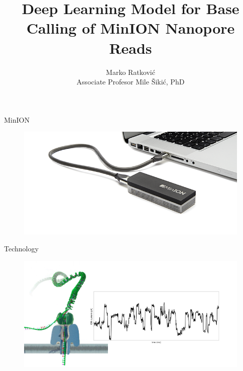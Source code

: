\documentclass[10pt]{beamer}
\title{Deep Learning Model for Base Calling of MinION Nanopore Reads}
\date{}
\author{Marko Ratković\\
Associate Profesor Mile Šikić, PhD}
\institute{University of Zagreb\\ Faculty of Electrical Engineering and Computing}
\begin{document}
\maketitle






\begin{frame}[fragile]{MinION}
	\begin{figure}
		\begin{center}
			\includegraphics[width=1\textwidth]{imgs/minion.png}%
		\end{center}
	\end{figure}
\end{frame}


\begin{frame}[fragile]{Technology}
	\begin{figure}
		\begin{center}
			\includegraphics[width=1\textwidth]{imgs/nanopore_no_bases.png}%
		\end{center}
	\end{figure}
\end{frame}
\end{document}
